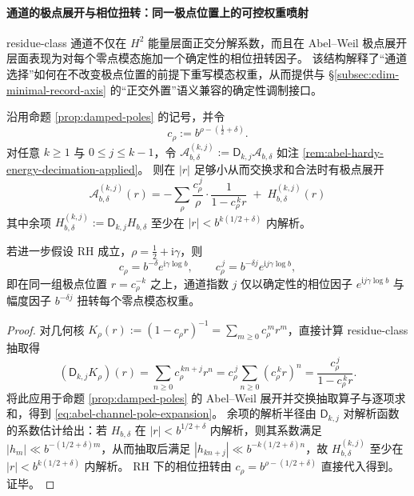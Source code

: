 \paragraph{通道的极点展开与相位扭转：同一极点位置上的可控权重喷射}
residue-class 通道不仅在 \(H^2\) 能量层面正交分解系数，而且在 Abel--Weil 极点展开层面表现为对每个零点模态施加一个确定性的相位扭转因子。
该结构解释了“通道选择”如何在不改变极点位置的前提下重写模态权重，从而提供与 \S\ref{subsec:cdim-minimal-record-axis} 的“正交外置”语义兼容的确定性调制接口。

\begin{proposition}\label{prop:abel-residue-class-channel-pole-expansion}
沿用命题 \ref{prop:damped-poles} 的记号，并令
\[
c_\rho:=b^{\rho-(\frac12+\delta)}.
\]
对任意 \(k\ge 1\) 与 \(0\le j\le k-1\)，令 \(\mathcal A_{b,\delta}^{(k,j)}:=\mathsf D_{k,j}\mathcal A_{b,\delta}\) 如注 \ref{rem:abel-hardy-energy-decimation-applied}。
则在 \(|r|\) 足够小从而交换求和合法时有极点展开
\begin{equation}\label{eq:abel-channel-pole-expansion}
\boxed{\;
\mathcal A_{b,\delta}^{(k,j)}(r)
=-\sum_{\rho}\frac{c_\rho^{\,j}}{\rho}\cdot\frac{1}{1-c_\rho^{\,k}r}
\;+\;H_{b,\delta}^{(k,j)}(r)\;}
\end{equation}
其中余项 \(H_{b,\delta}^{(k,j)}:=\mathsf D_{k,j}H_{b,\delta}\) 至少在 \(|r|<b^{k(1/2+\delta)}\) 内解析。
\par
若进一步假设 RH 成立，\(\rho=\tfrac12+\mathrm{i}\gamma\)，则
\[
c_\rho=b^{-\delta}e^{\mathrm{i}\gamma\log b},
\qquad
c_\rho^{\,j}=b^{-\delta j}e^{\mathrm{i}j\gamma\log b},
\]
即在同一组极点位置 \(r=c_\rho^{-k}\) 之上，通道指数 \(j\) 仅以确定性的相位因子 \(e^{\mathrm{i}j\gamma\log b}\) 与幅度因子 \(b^{-\delta j}\) 扭转每个零点模态权重。
\end{proposition}
\begin{proof}
对几何核 \(K_\rho(r):=(1-c_\rho r)^{-1}=\sum_{m\ge 0}c_\rho^{\,m}r^m\)，直接计算 residue-class 抽取得
\[
(\mathsf D_{k,j}K_\rho)(r)=\sum_{n\ge 0}c_\rho^{\,kn+j}r^n
=c_\rho^{\,j}\sum_{n\ge 0}(c_\rho^{\,k}r)^n
=\frac{c_\rho^{\,j}}{1-c_\rho^{\,k}r}.
\]
将此应用于命题 \ref{prop:damped-poles} 的 Abel--Weil 展开并交换抽取算子与逐项求和，得到 \eqref{eq:abel-channel-pole-expansion}。
余项的解析半径由 \(\mathsf D_{k,j}\) 对解析函数的系数估计给出：若 \(H_{b,\delta}\) 在 \(|r|<b^{1/2+\delta}\) 内解析，则其系数满足 \(|h_m|\ll b^{-(1/2+\delta)m}\)，从而抽取后满足 \(|h_{kn+j}|\ll b^{-k(1/2+\delta)n}\)，故 \(H_{b,\delta}^{(k,j)}\) 至少在 \(|r|<b^{k(1/2+\delta)}\) 内解析。
RH 下的相位扭转由 \(c_\rho=b^{\rho-(1/2+\delta)}\) 直接代入得到。证毕。
\end{proof}

